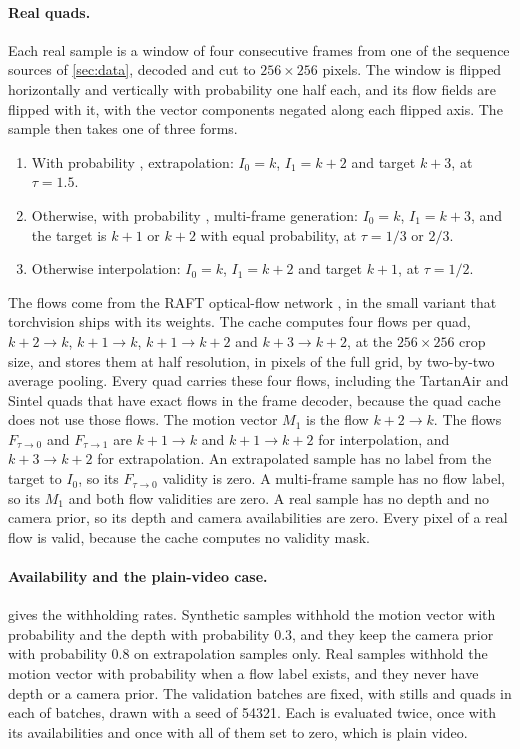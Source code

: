 \paragraph{Real quads.} Each real sample is a window of four consecutive frames from one of the sequence sources of \cref{sec:data}, decoded and cut to $256\times256$ pixels. The window is flipped horizontally and vertically with probability one half each, and its flow fields are flipped with it, with the vector components negated along each flipped axis. The sample then takes one of three forms.
\begin{enumerate}
\item With probability , extrapolation: $I_0=k$, $I_1=k+2$ and target $k+3$, at $\tau=1.5$.
\item Otherwise, with probability , multi-frame generation: $I_0=k$, $I_1=k+3$, and the target is $k+1$ or $k+2$ with equal probability, at $\tau=1/3$ or $2/3$.
\item Otherwise interpolation: $I_0=k$, $I_1=k+2$ and target $k+1$, at $\tau=1/2$.
\end{enumerate}
The flows come from the RAFT optical-flow network \cite{teed2020raft}, in the small variant that torchvision ships with its weights. The cache computes four flows per quad, $k+2\to k$, $k+1\to k$, $k+1\to k+2$ and $k+3\to k+2$, at the $256\times256$ crop size, and stores them at half resolution, in pixels of the full grid, by two-by-two average pooling. Every quad carries these four flows, including the TartanAir and Sintel quads that have exact flows in the frame decoder, because the quad cache does not use those flows. The motion vector $M_1$ is the flow $k+2\to k$. The flows $F_{\tau\to0}$ and $F_{\tau\to1}$ are $k+1\to k$ and $k+1\to k+2$ for interpolation, and $k+3\to k+2$ for extrapolation. An extrapolated sample has no label from the target to $I_0$, so its $F_{\tau\to0}$ validity is zero. A multi-frame sample has no flow label, so its $M_1$ and both flow validities are zero. A real sample has no depth and no camera prior, so its depth and camera availabilities are zero. Every pixel of a real flow is valid, because the cache computes no validity mask.

\paragraph{Availability and the plain-video case.}  gives the withholding rates. Synthetic samples withhold the motion vector with probability  and the depth with probability 0.3, and they keep the camera prior with probability 0.8 on extrapolation samples only. Real samples withhold the motion vector with probability  when a flow label exists, and they never have depth or a camera prior. The validation batches are fixed, with  stills and  quads in each of  batches, drawn with a seed of 54321. Each is evaluated twice, once with its availabilities and once with all of them set to zero, which is plain video.

